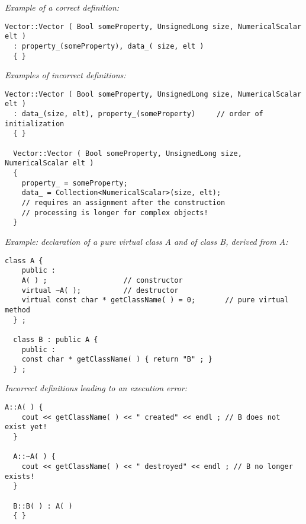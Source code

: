 \emph{Example of a correct definition:}
\begin{lstlisting}[frame=TBRL]
  Vector::Vector ( Bool someProperty, UnsignedLong size, NumericalScalar elt )
  : property_(someProperty), data_( size, elt )
  { }
\end{lstlisting}

\emph{Examples of incorrect definitions:}
\begin{lstlisting}[frame=TBRL]
  Vector::Vector ( Bool someProperty, UnsignedLong size, NumericalScalar elt )
  : data_(size, elt), property_(someProperty)     // order of initialization
  { }

  Vector::Vector ( Bool someProperty, UnsignedLong size, NumericalScalar elt )
  {
    property_ = someProperty;
    data_ = Collection<NumericalScalar>(size, elt);
    // requires an assignment after the construction
    // processing is longer for complex objects!
  }
\end{lstlisting}


\emph{Example: declaration of a pure virtual class A and of class B, derived from A:}
\begin{lstlisting}[frame=TBRL]
  class A {
    public :
    A( ) ;                  // constructor
    virtual ~A( );          // destructor
    virtual const char * getClassName( ) = 0;       // pure virtual method
  } ;

  class B : public A {
    public :
    const char * getClassName( ) { return "B" ; }
  } ;
\end{lstlisting}

\emph{Incorrect definitions leading to an execution error:}
\begin{lstlisting}[frame=TBRL]
  A::A( ) {
    cout << getClassName( ) << " created" << endl ; // B does not exist yet!
  }

  A::~A( ) {
    cout << getClassName( ) << " destroyed" << endl ; // B no longer exists!
  }

  B::B( ) : A( )
  { }
\end{lstlisting}

